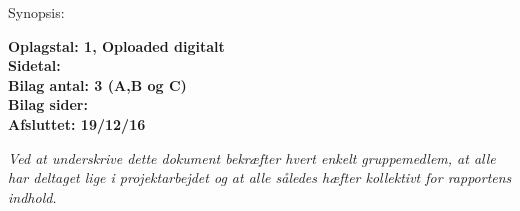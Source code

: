 \hfill
\begin{minipage}[t]{0.483\textwidth}
Synopsis: \\[5pt]
\fbox{\parbox{7cm}{\bigskip\bigskip}}

\vspace*{3cm}

\textbf{Oplagstal: 1, Oploaded digitalt} \\
\textbf{Sidetal: } \\
\textbf{Bilag antal: 3 (A,B og C)} \\
\textbf{Bilag sider: } \\
\textbf{Afsluttet: 19/12/16}

\end{minipage}
\footnotesize\itshape Ved at underskrive dette dokument bekræfter hvert enkelt gruppemedlem, at alle har deltaget lige i projektarbejdet og at alle således hæfter kollektivt for rapportens indhold.


\vfill




